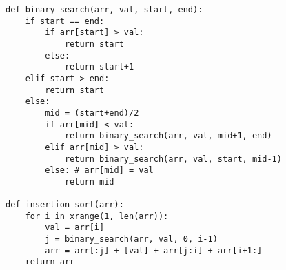 \documentclass{article}
\begin{document}
\begin{lstlisting}[float=hb!,%
caption={[Keresés]Python program. Bináris keresés és beszúró rendezés Python-ban},%
label=lst:bin_ker]
def binary_search(arr, val, start, end):
	if start == end:
		if arr[start] > val:
			return start
		else:
			return start+1
	elif start > end:
		return start
	else: 
		mid = (start+end)/2
		if arr[mid] < val:
			return binary_search(arr, val, mid+1, end)
		elif arr[mid] > val:
			return binary_search(arr, val, start, mid-1)
		else: # arr[mid] = val
			return mid
			
def insertion_sort(arr):
    for i in xrange(1, len(arr)):
        val = arr[i]
        j = binary_search(arr, val, 0, i-1)
        arr = arr[:j] + [val] + arr[j:i] + arr[i+1:]
    return arr
\end{lstlisting}
\end{document}
